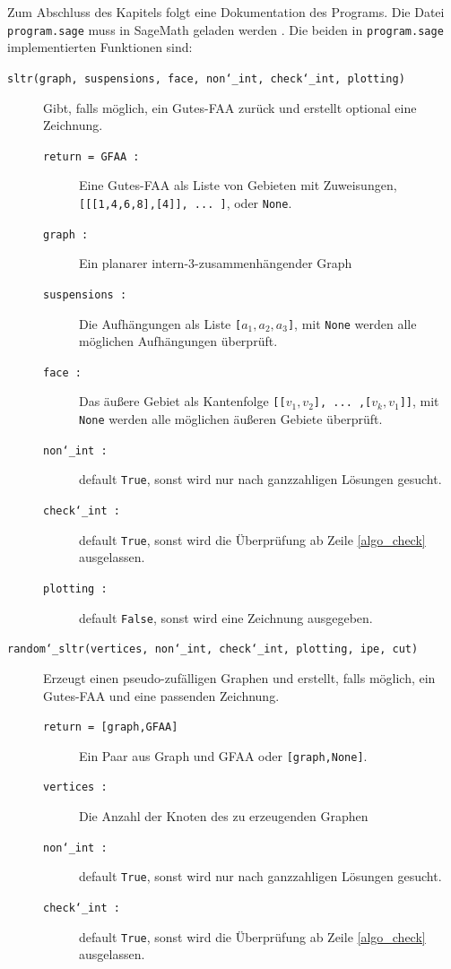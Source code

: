Zum Abschluss des Kapitels folgt eine Dokumentation des Programs. Die Datei \texttt{program.sage} muss in SageMath geladen werden \cite{sage}. Die beiden in \texttt{program.sage} implementierten Funktionen sind:
\begin{description}
\item[\texttt{sltr(graph, suspensions, face, non\char`_int, check\char`_int, plotting)}] \hfill 
Gibt, falls möglich, ein Gutes-FAA zurück und erstellt optional eine Zeichnung.
\begin{description}
\item[\texttt{return = GFAA :}] Eine Gutes-FAA als Liste von Gebieten mit Zuweisungen, \texttt{[[[1,4,6,8],[4]], ... ]}, oder \texttt{None}.
\item[\texttt{graph :}] Ein planarer intern-3-zusammenhängender Graph
\item[\texttt{suspensions :}] Die Aufhängungen als Liste \texttt{[$a_1,a_2,a_3$]}, mit \texttt{None} werden alle möglichen Aufhängungen überprüft.
\item[\texttt{face :}] Das äußere Gebiet als Kantenfolge \texttt{[[$v_1,v_2$], ... ,[$v_k,v_1$]]}, mit \texttt{None} werden alle möglichen äußeren Gebiete überprüft.
\item[\texttt{non\char`_int :}] default \texttt{True}, sonst wird nur nach ganzzahligen Lösungen gesucht.
\item[\texttt{check\char`_int :}] default \texttt{True}, sonst wird die Überprüfung ab Zeile \ref{algo_check} ausgelassen.
\item[\texttt{plotting :}] default \texttt{False}, sonst wird eine Zeichnung ausgegeben.
\end{description}
\item[\texttt{random\char`_sltr(vertices, non\char`_int, check\char`_int, plotting, ipe, cut)}] \hfill 
Erzeugt einen pseudo-zufälligen Graphen und erstellt, falls möglich, ein Gutes-FAA und eine passenden Zeichnung.
\begin{description}
\item[\texttt{return = [graph,GFAA]}] Ein Paar aus Graph und GFAA oder \texttt{[graph,None]}.
\item[\texttt{vertices :}] Die Anzahl der Knoten des zu erzeugenden Graphen
\item[\texttt{non\char`_int :}] default \texttt{True}, sonst wird nur nach ganzzahligen Lösungen gesucht.
\item[\texttt{check\char`_int :}] default \texttt{True}, sonst wird die Überprüfung ab Zeile \ref{algo_check} ausgelassen.

\end{description}
\end{description}
